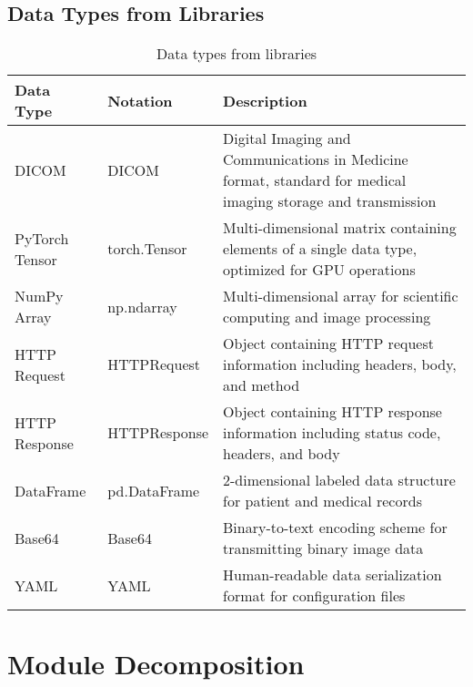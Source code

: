 \documentclass[12pt, titlepage]{article}
\begin{document}
    \subsection{Data Types from Libraries}
\begin{table}[H]
    \centering
    \renewcommand{\arraystretch}{1.2}
    \noindent
    \begin{tabular}{l l p{7.5cm}}
    \toprule
    \textbf{Data Type} & \textbf{Notation} & \textbf{Description} \\
    \midrule
    DICOM & DICOM & Digital Imaging and Communications in Medicine format, standard for medical imaging storage and transmission \\
    PyTorch Tensor & torch.Tensor & Multi-dimensional matrix containing elements of a single data type, optimized for GPU operations \\
    NumPy Array & np.ndarray & Multi-dimensional array for scientific computing and image processing \\
    HTTP Request & HTTPRequest & Object containing HTTP request information including headers, body, and method \\
    HTTP Response & HTTPResponse & Object containing HTTP response information including status code, headers, and body \\
    DataFrame & pd.DataFrame & 2-dimensional labeled data structure for patient and medical records \\
    Base64 & Base64 & Binary-to-text encoding scheme for transmitting binary image data \\
    YAML & YAML & Human-readable data serialization format for configuration files \\
    \bottomrule
    \end{tabular}
    \caption{Data types from libraries}
    \end{table}

\newpage
\section{Module Decomposition}
\end{document}
